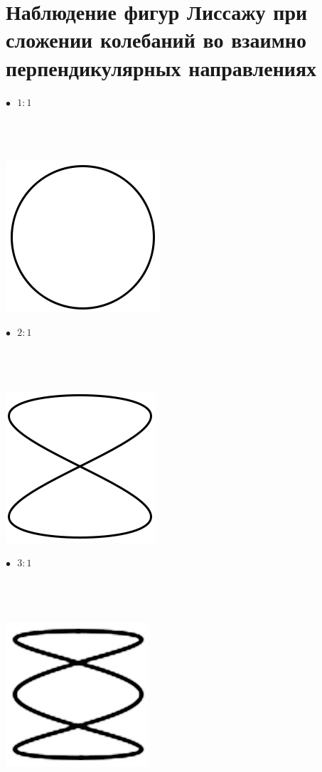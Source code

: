 \documentclass[a4paper,12pt]{article} %
\begin{document}
\section{Наблюдение фигур Лиссажу при сложении колебаний во взаимно перпендикулярных направлениях}
$\bullet \text{ }1:1$\\\\\\\\\newline
\begin{center}
\includegraphics{11}
\end{center}
$\bullet \text{ }2:1$\\\\\\\\\newline
\begin{center}
\includegraphics{12}
\end{center}
$\bullet \text{ }3:1$\\\\\\\\\newline
\begin{center}
\includegraphics[scale=3.6]{13}
\end{center}
\end{document}

